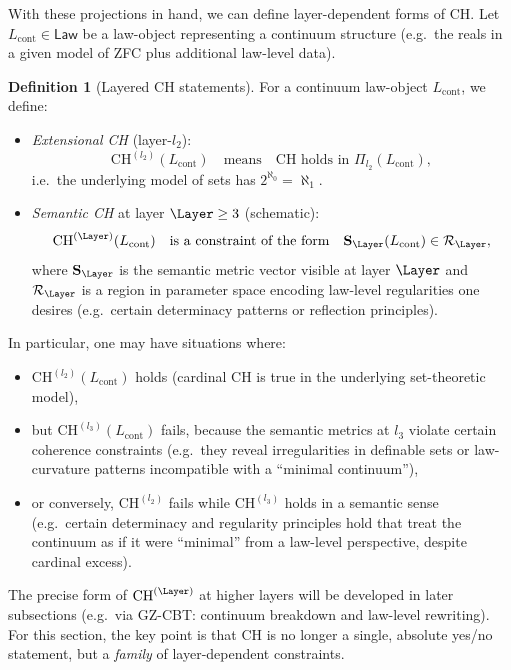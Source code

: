 \documentclass[11pt]{book}
\theoremstyle{plain}
\theoremstyle{definition}
\newtheorem{definition}[theorem]{Definition} \theoremstyle{remark}
\begin{document}
With these projections in hand, we can define layer-dependent forms of
CH. Let $L_{\mathrm{cont}}\in\mathsf{Law}$ be a law-object representing
a continuum structure (e.g.\ the reals in a given model of ZFC plus
additional law-level data).

\begin{definition}[Layered CH statements]
  For a continuum law-object $L_{\mathrm{cont}}$, we define:
  \begin{itemize}
    \item \emph{Extensional CH} (layer-$l_2$):
      \[
        \mathrm{CH}^{(l_2)}(L_{\mathrm{cont}})
        \quad\text{means}\quad
        \text{CH holds in }\Pi_{l_2}(L_{\mathrm{cont}}),
      \]
      i.e.\ the underlying model of sets has $2^{\aleph_0}=\aleph_1$.
    \item \emph{Semantic CH} at layer $\Layer\ge3$ (schematic):
      \[
        \mathrm{CH}^{(\Layer)}(L_{\mathrm{cont}})
        \quad\text{is a constraint of the form}\quad
        \mathbf{S}_\Layer(L_{\mathrm{cont}}) \in \mathcal{R}_\Layer,
      \]
      where $\mathbf{S}_\Layer$ is the semantic metric vector visible
      at layer $\Layer$ and $\mathcal{R}_\Layer$ is a region in
      parameter space encoding law-level regularities one desires
      (e.g.\ certain determinacy patterns or reflection principles).
  \end{itemize}
\end{definition}

In particular, one may have situations where:

\begin{itemize}
  \item $\mathrm{CH}^{(l_2)}(L_{\mathrm{cont}})$ holds (cardinal CH
        is true in the underlying set-theoretic model),
  \item but $\mathrm{CH}^{(l_3)}(L_{\mathrm{cont}})$ fails, because the
        semantic metrics at $l_3$ violate certain coherence constraints
        (e.g.\ they reveal irregularities in definable sets or law-
        curvature patterns incompatible with a “minimal continuum”),
  \item or conversely, $\mathrm{CH}^{(l_2)}$ fails while
        $\mathrm{CH}^{(l_3)}$ holds in a semantic sense (e.g.\ certain
        determinacy and regularity principles hold that treat the
        continuum as if it were “minimal” from a law-level perspective,
        despite cardinal excess).
\end{itemize}

The precise form of $\mathrm{CH}^{(\Layer)}$ at higher layers will be
developed in later subsections (e.g.\ via GZ-CBT: continuum breakdown
and law-level rewriting). For this section, the key point is that CH is
no longer a single, absolute yes/no statement, but a \emph{family} of
layer-dependent constraints.
\end{document}
